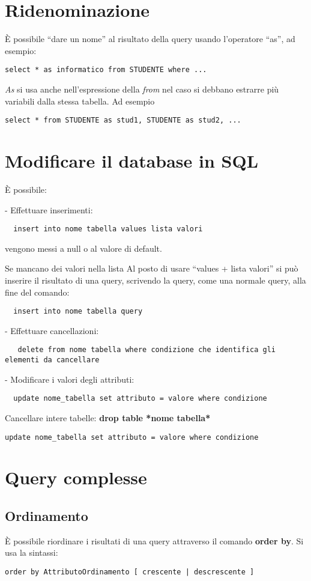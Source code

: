 \documentclass[\main/main.tex]{subfiles}
\begin{document}
\section{Ridenominazione}
È possibile ``dare un nome'' al risultato della query usando l'operatore ``as'', ad esempio:
\begin{verbatim}
select * as informatico from STUDENTE where ...
\end{verbatim}
\textit{As} si usa anche nell'espressione della \textit{from} nel caso si debbano estrarre più variabili dalla stessa tabella.
Ad esempio
\begin{verbatim}
select * from STUDENTE as stud1, STUDENTE as stud2, ...
\end{verbatim}


\section{Modificare il database in SQL}
È possibile:

- Effettuare inserimenti:
\begin{verbatim}
  insert into nome tabella values lista valori
\end{verbatim}
vengono messi a null o al valore di default.

Se mancano dei valori nella lista
Al posto di usare ``values + lista valori'' si può inserire il risultato di una query, scrivendo la query, come una normale query, alla fine del comando:
\begin{verbatim}
  insert into nome tabella query
      \end{verbatim}


- Effettuare cancellazioni:
\begin{verbatim}
   delete from nome tabella where condizione che identifica gli elementi da cancellare
\end{verbatim}

- Modificare i valori degli attributi:
\begin{verbatim}
  update nome_tabella set attributo = valore where condizione
\end{verbatim}

Cancellare intere tabelle: \textbf{drop table *nome tabella*}

\begin{verbatim}
update nome_tabella set attributo = valore where condizione
\end{verbatim}

\section{Query complesse}
\subsection{Ordinamento}
È possibile riordinare i risultati di una query attraverso il comando \textbf{order by}.
Si usa la sintassi:
\begin{verbatim}
order by AttributoOrdinamento [ crescente | descrescente ]
\end{verbatim}
\end{document}
